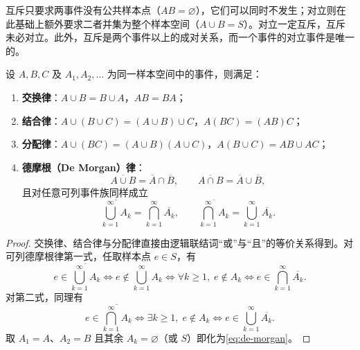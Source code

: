 
\begin{pitfall}[互斥与对立的区别]
互斥只要求两事件没有公共样本点（$AB=\varnothing$），它们可以同时不发生；对立则在此基础上额外要求二者并集为整个样本空间（$A\cup B=S$）。对立一定互斥，互斥未必对立。此外，互斥是两个事件以上的成对关系，而一个事件的对立事件是唯一的。
\end{pitfall}

\begin{proposition}[事件运算律]
\label{prop:event-laws}
设 $A,B,C$ 及 $A_1,A_2,\ldots$ 为同一样本空间中的事件，则满足：
\begin{enumerate}
  \item \textbf{交换律}：$A\cup B=B\cup A$，$AB=BA$；
  \item \textbf{结合律}：$A\cup(B\cup C)=(A\cup B)\cup C$，$A(BC)=(AB)C$；
  \item \textbf{分配律}：$A\cup(BC)=(A\cup B)(A\cup C)$，$A(B\cup C)=AB\cup AC$；
  \item \textbf{德摩根（De Morgan）律}：
  \begin{equation}
    \overline{A\cup B}=\overline{A}\cap\overline{B},\qquad
    \overline{A\cap B}=\overline{A}\cup\overline{B},
    \label{eq:de-morgan}
  \end{equation}
  且对任意可列事件族同样成立
  \[
    \overline{\bigcup_{k=1}^{\infty}A_k}=\bigcap_{k=1}^{\infty}\overline{A_k},\qquad
    \overline{\bigcap_{k=1}^{\infty}A_k}=\bigcup_{k=1}^{\infty}\overline{A_k}.
  \]
\end{enumerate}
\end{proposition}
\begin{proof}
交换律、结合律与分配律直接由逻辑联结词“或”与“且”的等价关系得到。对可列德摩根律第一式，任取样本点 $e\in S$，有
\[
  e\in\overline{\bigcup_{k=1}^{\infty}A_k}
  \iff e\notin\bigcup_{k=1}^{\infty}A_k
  \iff \forall k\ge 1,\;e\notin A_k
  \iff e\in\bigcap_{k=1}^{\infty}\overline{A_k}.
\]
对第二式，同理有
\[
  e\in\overline{\bigcap_{k=1}^{\infty}A_k}
  \iff \exists k\ge 1,\;e\notin A_k
  \iff e\in\bigcup_{k=1}^{\infty}\overline{A_k}.
\]
取 $A_1=A$、$A_2=B$ 且其余 $A_k=\varnothing$（或 $S$）即化为\eqref{eq:de-morgan}。
\end{proof}

